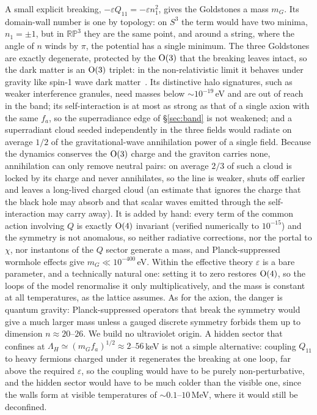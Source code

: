 \documentclass[11pt,a4paper]{article}
\newcommand{\RP}{\mathbb{RP}^3}
\begin{document}
A small explicit breaking, $-\varepsilon Q_{11}=-\varepsilon n_1^2$, gives the Goldstones a mass $m_G$. Its domain-wall number is one by topology: on $S^3$ the term would have two minima, $n_1=\pm1$, but in $\RP$ they are the same point, and around a string, where the angle of $n$ winds by $\pi$, the potential has a single minimum.
The three Goldstones are exactly degenerate, protected by the ${\rm O}(3)$ that the breaking leaves intact, so the dark matter is an ${\rm O}(3)$ triplet: in the non-relativistic limit it behaves under gravity like spin-1 wave dark matter~\cite{AdsheadLozanov2021,Amin2022VDM}. Its distinctive halo signatures, such as weaker interference granules, need masses below $\sim10^{-19}$\,eV and are out of reach in the band; its self-interaction is at most as strong as that of a single axion with the same $f_a$, so the superradiance edge of \S\ref{sec:band} is not weakened; and a superradiant cloud seeded independently in the three fields would radiate on average $1/2$ of the gravitational-wave annihilation power of a single field. Because the dynamics conserves the ${\rm O}(3)$ charge and the graviton carries none, annihilation can only remove neutral pairs: on average $2/3$ of such a cloud is locked by its charge and never annihilates, so the line is weaker, shuts off earlier and leaves a long-lived charged cloud (an estimate that ignores the charge that the black hole may absorb and that scalar waves emitted through the self-interaction may carry away).
It is added by hand: every term of the common action involving $Q$ is exactly ${\rm O}(4)$ invariant (verified numerically to $10^{-15}$) and the symmetry is not anomalous, so neither radiative corrections, nor the portal to $\chi$, nor instantons of the $Q$ sector generate a mass, and Planck-suppressed wormhole effects give $m_G\ll10^{-400}$\,eV.
Within the effective theory $\varepsilon$ is a bare parameter, and a technically natural one: setting it to zero restores ${\rm O}(4)$, so the loops of the model renormalise it only multiplicatively, and the mass is constant at all temperatures, as the lattice assumes. As for the axion, the danger is quantum gravity: Planck-suppressed operators that break the symmetry would give a much larger mass unless a gauged discrete symmetry forbids them up to dimension $n\approx20$--$26$. We build no ultraviolet origin. A hidden sector that confines at $\Lambda_H\simeq(m_Gf_a)^{1/2}\approx2$--$56$\,keV is not a simple alternative: coupling $Q_{11}$ to heavy fermions charged under it regenerates the breaking at one loop, far above the required $\varepsilon$, so the coupling would have to be purely non-perturbative, and the hidden sector would have to be much colder than the visible one, since the walls form at visible temperatures of $\sim0.1$--$10$\,MeV, where it would still be deconfined.
\end{document}
